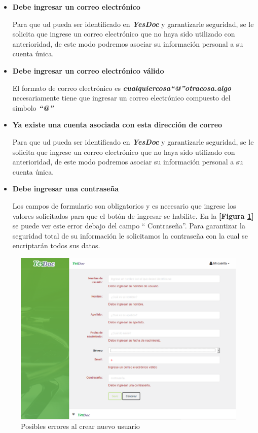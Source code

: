 \begin{itemize}
	\item \textbf{Debe ingresar un correo electrónico}
	
		Para que ud pueda ser identificado en \textbf{\textit{YesDoc}} y garantizarle seguridad, se le solicita que ingrese un correo electrónico que no haya sido utilizado con anterioridad, de este modo podremos asociar su información personal a su cuenta única.
		
	\item \textbf{Debe ingresar un correo electrónico válido}	
	
	El formato de correo electrónico  es \textbf{\textit{cualquiercosa``@''otracosa.algo}} necesariamente tiene que ingresar un correo electrónico compuesto del simbolo \textbf{\textit{``@''}}
	
	\item \textbf{Ya existe una cuenta asociada con esta dirección de correo}			
	
			Para que ud pueda ser identificado en \textbf{\textit{YesDoc}} y garantizarle seguridad, se le solicita que ingrese un correo electrónico que no haya sido utilizado con anterioridad, de este modo podremos asociar su información personal a su cuenta única.
			
	\item \textbf{Debe ingresar una contraseña}	
	
		Los campos de formulario son obligatorios y es necesario que ingrese los valores solicitados para que el botón de ingresar se habilite.	 En la \textbf{[Figura \ref{mu-nuevo_usuario}]} se puede ver este error debajo del campo `` Contraseña''. Para garantizar la seguridad total de su información le solicitamos la contraseña con la cual se encriptarán todos sus datos.
		
\end{itemize}
 \begin{figure}
 	\centering
 	\includegraphics[width=.8\textwidth]{img/manual_de_usuario/nuevo_usuario}
 	\caption{Posibles errores al crear nuevo usuario}
 	\label{mu-nuevo_usuario}
 \end{figure}



